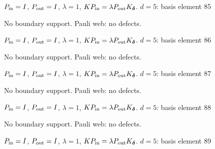$P_{\rm in}=I$, \quad $P_{\rm out}=I$, \quad $\lambda=1$, \qquad $K P_{\rm in}=\lambda P_{\rm out}K_{\boldsymbol\delta}$.
\vfill
{\footnotesize\texttt{}}
\newpage
{}
{\Large $d=5$: basis element 85}\par
No boundary support. Pauli web: no defects.
\begin{center}
\end{center}
\vspace{-1mm}
$P_{\rm in}=I$, \quad $P_{\rm out}=I$, \quad $\lambda=1$, \qquad $K P_{\rm in}=\lambda P_{\rm out}K_{\boldsymbol\delta}$.
\vfill
{\footnotesize\texttt{}}
\newpage
{}
{\Large $d=5$: basis element 86}\par
No boundary support. Pauli web: no defects.
\begin{center}
\end{center}
\vspace{-1mm}
$P_{\rm in}=I$, \quad $P_{\rm out}=I$, \quad $\lambda=1$, \qquad $K P_{\rm in}=\lambda P_{\rm out}K_{\boldsymbol\delta}$.
\vfill
{\footnotesize\texttt{}}
\newpage
{}
{\Large $d=5$: basis element 87}\par
No boundary support. Pauli web: no defects.
\begin{center}
\end{center}
\vspace{-1mm}
$P_{\rm in}=I$, \quad $P_{\rm out}=I$, \quad $\lambda=1$, \qquad $K P_{\rm in}=\lambda P_{\rm out}K_{\boldsymbol\delta}$.
\vfill
{\footnotesize\texttt{}}
\newpage
{}
{\Large $d=5$: basis element 88}\par
No boundary support. Pauli web: no defects.
\begin{center}
\end{center}
\vspace{-1mm}
$P_{\rm in}=I$, \quad $P_{\rm out}=I$, \quad $\lambda=1$, \qquad $K P_{\rm in}=\lambda P_{\rm out}K_{\boldsymbol\delta}$.
\vfill
{\footnotesize\texttt{}}
\newpage
{}
{\Large $d=5$: basis element 89}\par

